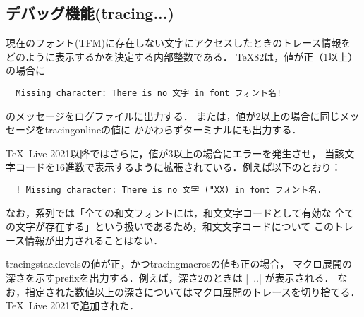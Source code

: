 \documentclass[a4paper,11pt,nomag,dvipdfmx]{jsarticle}
\begin{document}
\subsection{デバッグ機能(\.{tracing...})}
\begin{cslist}
  現在のフォント(TFM)に存在しない文字にアクセスしたときのトレース情報を
  どのように表示するかを決定する内部整数である．
  \TeX82は，値が正（1以上）の場合に
\begin{verbatim}
  Missing character: There is no 文字 in font フォント名!
\end{verbatim}
  のメッセージをログファイルに出力する．
  また\eTeX は，値が2以上の場合に同じメッセージを\.{tracingonline}の値に
  かかわらずターミナルにも出力する．

  \TeX~Live 2021以降ではさらに，値が3以上の場合にエラーを発生させ，
  当該文字コードを16進数で表示するように拡張されている．例えば以下のとおり：
\begin{verbatim}
  ! Missing character: There is no 文字 ("XX) in font フォント名.
\end{verbatim}

  なお，\pTeX 系列では「全ての和文フォントには，和文文字コードとして有効な
  全ての文字が存在する」という扱いであるため，和文文字コードについて
  このトレース情報が出力されることはない．

  \.{tracingstacklevels}の値が正，かつ\.{tracingmacros}の値も正の場合，
  マクロ展開の深さを示すprefixを出力する．例えば，深さ2のときは |~..| が表示される．
  なお，指定された数値以上の深さについてはマクロ展開のトレースを切り捨てる．
  \TeX~Live 2021で追加された．
\end{cslist}

\ifdefined\partokenname %
\end{document}
